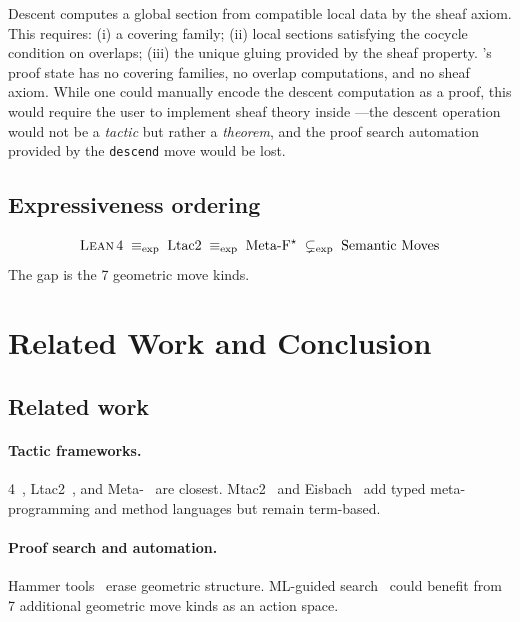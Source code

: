 \documentclass[11pt]{article}
\begin{document}
Descent computes a global section from compatible local data
by the sheaf axiom.  This requires: (i) a covering family;
(ii) local sections satisfying the cocycle condition on
overlaps; (iii) the unique gluing provided by the sheaf
property.  \LEAN's proof state has no covering families, no
overlap computations, and no sheaf axiom.  While one could
manually encode the descent computation as a \LEAN{} proof,
this would require the user to implement sheaf theory inside
\LEAN---the descent operation would not be a \emph{tactic}
but rather a \emph{theorem}, and the proof search automation
provided by the \texttt{descend} move would be lost.

\subsection{Expressiveness ordering}

\[
  \textsc{Lean}\,4 \;\equiv_{\mathrm{exp}}\; \text{Ltac2}
  \;\equiv_{\mathrm{exp}}\; \text{Meta-F$^{\star}$}
  \;\subsetneq_{\mathrm{exp}}\; \text{Semantic Moves}
\]
The gap is the 7 geometric move kinds.


\section{Related Work and Conclusion}\label{sec:conclusion}

\subsection{Related work}

\paragraph{Tactic frameworks.}
\LEAN{} 4~\cite{deMoura2021Lean4}, Ltac2~\cite{Pedrot2019Ltac2},
and Meta-\Fstar{}~\cite{MartinezEtAl2019MetaFStar} are closest.
Mtac2~\cite{Kaiser2018Mtac2} and Eisbach~\cite{Matichuk2016Eisbach}
add typed meta-programming and method languages but remain term-based.

\paragraph{Proof search and automation.}
Hammer tools~\cite{Blanchette2016Hammers} erase geometric structure.
ML-guided search~\cite{Polu2020GPTf,Yang2024LeanDojo} could benefit
from 7 additional geometric move kinds as an action space.
\end{document}
